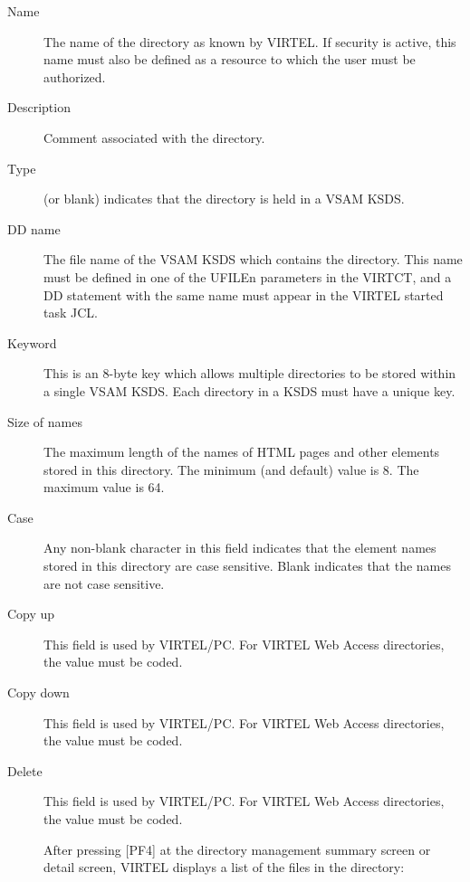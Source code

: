 \documentclass[letterpaper,10pt,english]{sphinxmanual}
\begin{document}
 
\begin{description}
\item[{Name}] \leavevmode
The name of the directory as known by VIRTEL. If security is active,
this name must also be defined as a resource to which the user must
be authorized.

\item[{Description}] \leavevmode
Comment associated with the directory.

\item[{Type}] \leavevmode
{} (or blank) indicates that the directory is held in a VSAM
KSDS.

\item[{DD name}] \leavevmode
The file name of the VSAM KSDS which contains the directory. This name must be defined in one of the UFILEn parameters in the VIRTCT, and a DD statement with the same name must appear in the VIRTEL
started task JCL.

\item[{Keyword}] \leavevmode
This is an 8-byte key which allows multiple directories to be stored within a single VSAM KSDS. Each directory in a KSDS must have a unique key.

\item[{Size of names}] \leavevmode
The maximum length of the names of HTML pages and other elements stored in this directory. The minimum (and default) value is 8. The maximum value is 64.

\item[{Case}] \leavevmode
Any non-blank character in this field indicates that the element names stored in this directory are case sensitive. Blank indicates that the names are not case sensitive.

\item[{Copy up}] \leavevmode
This field is used by VIRTEL/PC. For VIRTEL Web Access directories, the value  must be coded.

\item[{Copy down}] \leavevmode
This field is used by VIRTEL/PC. For VIRTEL Web Access directories, the value  must be coded.

\item[{Delete}] \leavevmode
This field is used by VIRTEL/PC. For VIRTEL Web Access directories, the value  must be coded.

After pressing {[}PF4{]} at the directory management summary screen or detail screen, VIRTEL displays a list of the files in the directory:

\end{description}
\end{document}
